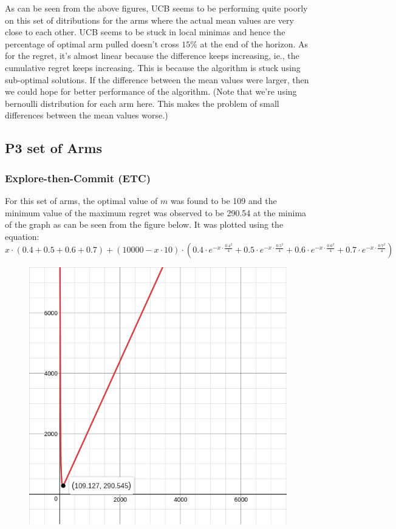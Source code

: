 \documentclass[12pt]{report}
\begin{document}
			\noindent As can be seen from the above figures, UCB seems to be performing quite poorly on this set of ditributions for the arms where the actual mean values are very close to each other. UCB seems to be stuck in local minimas and hence the percentage of optimal arm pulled doesn't cross $15\%$ at the end of the horizon. As for the regret, it's almost linear because the difference keeps increasing, ie., the cumulative regret keeps increasing. This is because the algorithm is stuck using sub-optimal solutions. If the difference between the mean values were larger, then we could hope for better performance of the algorithm. (Note that we're using bernoulli distribution for each arm here. This makes the problem of small differences between the mean values worse.)
			
	\subsection{P3 set of Arms}
		\subsubsection{Explore-then-Commit (ETC)}
			For this set of arms, the optimal value of $m$ was found to be 109 and the minimum value of the maximum regret was observed to be 290.54 at the minima of the graph as can be seen from the figure below. It was plotted using the equation:
			$$x\cdot\left(0.4+0.5+0.6+0.7\right)+\left(10000-x\cdot10\right)\cdot\left(0.4\cdot e^{-x\cdot\frac{0.4^2}{4}}+0.5\cdot e^{-x\cdot\frac{0.5^2}{4}}+0.6\cdot e^{-x\cdot\frac{0.6^2}{4}}+0.7\cdot e^{-x\cdot\frac{0.7^2}{4}}\right)$$
			
			\begin{figure}[H]
				\includegraphics[scale=0.5]{Figures/m_P3.png}
			\end{figure}
			
\end{document}
